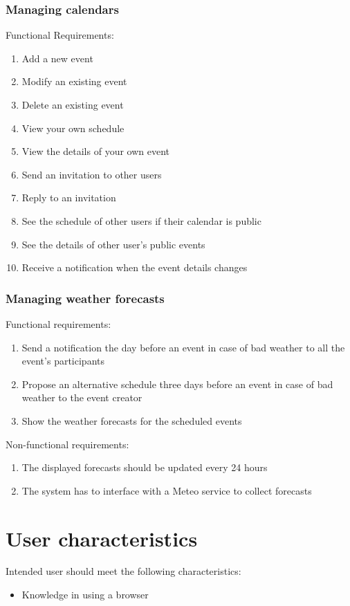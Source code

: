 \documentclass[10pt,a4paper,titlepage]{article}
\begin{document}
\subsubsection{Managing calendars}
Functional Requirements:
\begin{enumerate}[label = FR \arabic*:]
\item Add a new event
\item Modify an existing event
\item Delete an existing event
\item View your own schedule 
\item View the details of your own event
\item Send an invitation to other users
\item Reply to an invitation
\item See the schedule of other users if their calendar is public
\item See the details of other user's public events
\item Receive a notification when the event details changes
\end{enumerate}

\subsubsection{Managing weather forecasts}
Functional requirements:
\begin{enumerate}[label = FR \arabic*:]
\item Send a notification the day before an event in case of bad weather to all the event's participants
\item Propose an alternative schedule three days before an event in case of bad weather to the event creator
\item Show the weather forecasts for the scheduled events 
\end{enumerate}
Non-functional requirements:
\begin{enumerate}[label = NFR \arabic*:]
\item The displayed forecasts should be updated every 24 hours
\item The system has to interface with a Meteo service to collect forecasts
\end{enumerate}

\section{User characteristics}
Intended user should meet the following characteristics:
\begin{itemize}
\item Knowledge in using a browser
\end{itemize}
\end{document}
